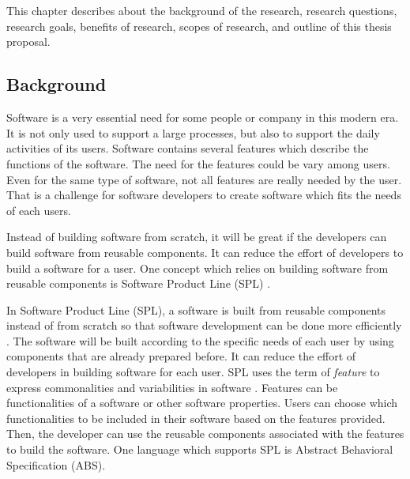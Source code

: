 \chapter{\babSatu}
This chapter describes about the background of the research, research questions, research goals, benefits of research, scopes of research, and outline of this thesis proposal.

\section{Background}
Software is a very essential need for some people or company in this modern era. It is not only used to support a large processes, but also to support the daily activities of its users. Software contains several features which describe the functions of the software. The need for the features could be vary among users. Even for the same type of software, not all features are really needed by the user. That is a challenge for software developers to create software which fits the needs of each users.

Instead of building software from scratch, it will be great if the developers can build software from reusable components. It can reduce the effort of developers to build a software for a user. One concept which relies on building software from reusable components is Software Product Line (SPL) \citep{paper.lee.featuremanagement}.

In Software Product Line (SPL), a software is built from reusable components instead of from scratch so that software development can be done more efficiently \citep{book.apel.FeatureOrientedSoftware}. The software will be built according to the specific needs of each user by using components that are already prepared before. It can reduce the effort of developers in building software for each user. SPL uses the term of {\it feature} to express commonalities and variabilities in software \citep{paper.kastnerApel.FeatureOrientedSoftwareDevelopment}. Features can be functionalities of a software or other software properties. Users can choose which functionalities to be included in their software based on the features provided. Then, the developer can use the reusable components associated with the features to build the software. One language which supports SPL is Abstract Behavioral Specification (ABS).

